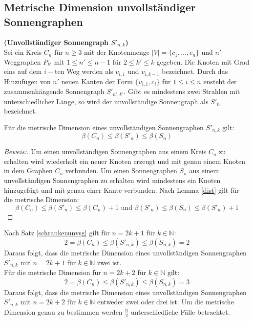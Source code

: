 \subsection{Metrische Dimension unvollständiger Sonnengraphen}  	
\label{chap_usonne} 
\begin{defi}{\textbf{(Unvollständiger Sonnengraph $S'_{n,k}$)}}\\
Sei ein Kreis $C_n$ für $n \geq 3$ mit der Knotenmenge $|V|=\{ c_1, \ldots , c_n \}$ und $n'$ Weggraphen $P_{k'}$ mit $1 \leq n' \leq n-1$ für $2 \leq k' \leq k$ gegeben. Die Knoten mit Grad eins auf dem $i-$ten Weg werden als $v_{i,1}$ und $v_{i,k-1}$ bezeichnet. Durch das Hinzufügen von $n'$ neuen Kanten der Form $\{v_{i,1},c_i\}$ für $1 \leq i \leq n$ ensteht der zusammenhängende Sonnengraph $S'_{n',k'}$. Gibt es mindestens zwei Strahlen mit unterschiedlicher Länge, so wird der unvollständige Sonnengraph als $S'_n$ bezeichnet. 
\end{defi}
\begin{satz}
\label{schrankenunvsg}
Für die metrische Dimension eines unvollständigen Sonnengraphen $S'_{n,k}$ gilt:
$$\beta(C_n) \leq \beta(S'_{n})\leq \beta(S_{n})$$
\end{satz}
\begin{proof}[Beweis:]
Um einen unvollständigen Sonnengraphen aus einem Kreis $C_n$ zu erhalten wird wiederholt ein neuer Knoten erzeugt und mit genau einem Knoten in dem Graphen $C_n$ verbunden. Um einen Sonnengraphen $S_{n}$ aus einem unvollständigen Sonnengraphen zu erhalten wird mindestens ein Knoten hinzugefügt und mit genau einer Kante verbunden. Nach Lemma \ref{dist} gilt für die metrische Dimension:
$$\beta(C_n) \leq \beta(S'_{n}) \leq \beta(C_n)+1 \text{ und } \beta(S'_{n}) \leq \beta(S_n) \leq \beta(S'_{n})+1$$
\end{proof}
\begin{bem}
Nach Satz \ref{schrankenunvsg} gilt für $n=2k+1$ für $k \in \mathbb{N}$: $$2=\beta(C_n) \leq \beta(S'_{n,k})\leq \beta(S_{n,k})=2$$
Daraus folgt, dass die metrische Dimension eines unvollständigen Sonnengraphen $S'_{n,k}$ mit $n=2k+1$ für $k \in \mathbb{N}$ zwei ist.\\
Für die metrische Dimension für $n=2k+2$ für $k \in \mathbb{N}$ gilt: $$2=\beta(C_n) \leq \beta(S'_{n,k})\leq \beta(S_{n,k})=3$$
Daraus folgt, dass die metrische Dimension eines unvollständigen Sonnengraphen $S'_{n,k}$ mit $n=2k+2$ für $k \in \mathbb{N}$ entweder zwei oder drei ist. Um die metrische Dimension genau zu bestimmen werden $\frac{n}{2}$ unterschiedliche Fälle betrachtet.
\end{bem}
